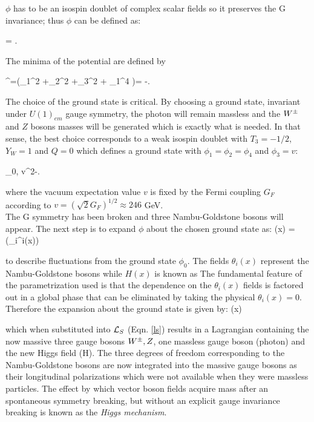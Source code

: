 \noindent $\phi$ has to be an isospin doublet of complex scalar fields so it preserves the G invariance; thus $\phi$ can be defined as:

\beqn
\phi =  \equiv {}.
\eeqn

The minima of the potential are defined by

\beqn
\phi^\dagger\phi=(\phi_1^2 +\phi_2^2 +\phi_3^2 + \phi_1^4 )= -.
\eeqn

The choice of the ground state is critical. By choosing a ground state, invariant under $U(1)_{em}$ gauge symmetry, the photon will remain massless and the $W^\pm$ and $Z$ bosons masses will be generated which is exactly what is needed. In that sense, the best choice corresponds to a weak isospin doublet with $T_3=-1/2$, $Y_W=1$ and $Q=0$ which defines a ground state with $\phi_1=\phi_2=\phi_4$ and $\phi_3=v$:

\beqn\label{field_exp}
\phi_0\equiv{}, \qquad v^2\equiv-.
\eeqn

\noindent where the vacuum expectation value $v$ is fixed by the Fermi coupling $G_F$ according to $v=(\sqrt{2}G_F)^{1/2}\approx 246$ GeV.\\

The G symmetry has been broken and three Nambu-Goldstone bosons will appear. The next step is to expand $\phi$ about the chosen ground state as:
\beqn
\phi(x) = \exp\left(\sigma_i\theta^i(x)\right) \approx {} 
\eeqn

\noindent to describe fluctuations from the ground state $\phi_0$. The fields $\theta_i(x)$ represent the Nambu-Goldstone bosons while $H(x)$ is known as  The fundamental feature of the parametrization used is that the dependence on the $\theta_i(x)$ fields is factored out in a global phase that can be eliminated by taking the physical  $\theta_i(x)=0$. Therefore the expansion about the ground state is given by:
\beqn\label{higgs_dublet}
\phi(x)
\eeqn

\noindent which when substituted into $\mathcal{L}_S$ (Eqn. \ref{ls}) results in a Lagrangian containing the now massive three gauge bosons $W^\pm, Z$, one massless gauge boson (photon) and the new Higgs field (H). The three degrees of freedom corresponding to the Nambu-Goldstone bosons are now integrated into the massive gauge bosons as their longitudinal polarizations which were not available when they were massless particles. The effect by which vector boson fields acquire mass after an spontaneous symmetry breaking, but without an explicit gauge invariance breaking is known as the \textit{Higgs mechanism}.\\

